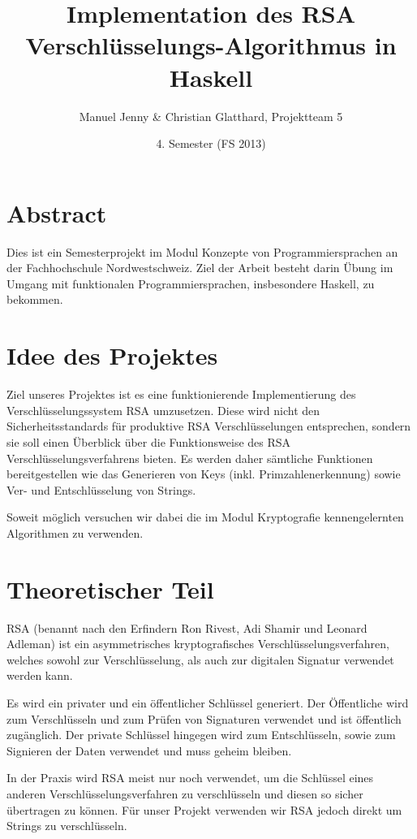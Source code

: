 \documentclass[a4paper, 11pt]{article} %
\title{Implementation des RSA Verschlüsselungs-Algorithmus in Haskell}
\author{Manuel Jenny \& Christian Glatthard, Projektteam 5}
\date{4. Semester (FS 2013)}
\begin{document}
\maketitle

\setcounter{page}{1}


\section{Abstract}
Dies ist ein Semesterprojekt im Modul Konzepte von Programmiersprachen an der Fachhochschule Nordwestschweiz. Ziel der Arbeit besteht darin Übung im Umgang mit funktionalen Programmiersprachen, insbesondere Haskell, zu bekommen.

\section{Idee des Projektes}
Ziel unseres Projektes ist es eine funktionierende Implementierung des Verschlüsselungssystem RSA umzusetzen. Diese wird nicht den Sicherheitsstandards für produktive RSA Verschlüsselungen entsprechen, sondern sie soll einen Überblick über die Funktionsweise des RSA Verschlüsselungsverfahrens bieten. Es werden daher sämtliche Funktionen bereitgestellen wie das Generieren von Keys (inkl. Primzahlenerkennung) sowie Ver- und Entschlüsselung von Strings.

Soweit möglich versuchen wir dabei die im Modul Kryptografie kennengelernten Algorithmen zu verwenden.

\section{Theoretischer Teil}
RSA (benannt nach den Erfindern Ron Rivest, Adi Shamir und Leonard Adleman) ist ein asymmetrisches kryptografisches Verschlüsselungsverfahren, welches sowohl zur Verschlüsselung, als auch zur digitalen Signatur verwendet werden kann.

Es wird ein privater und ein öffentlicher Schlüssel generiert. Der Öffentliche wird zum Verschlüsseln und zum Prüfen von Signaturen verwendet und ist öffentlich zugänglich. Der private Schlüssel hingegen wird zum Entschlüsseln, sowie zum Signieren der Daten verwendet und muss geheim bleiben.

In der Praxis wird RSA meist nur noch verwendet, um die Schlüssel eines anderen Verschlüsselungsverfahren zu verschlüsseln und diesen so sicher übertragen zu können. Für unser Projekt verwenden wir RSA jedoch direkt um Strings zu verschlüsseln.
\end{document}

